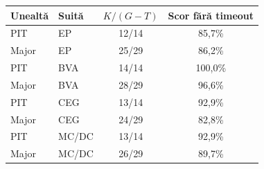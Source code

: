 \begin{center}
\begingroup\small
\begin{tabular}{@{}llcc@{}}
\toprule
Unealtă & Suită & $K/(G-T)$ & Scor fără timeout \\
\midrule
PIT & EP & 12/14 & 85,7\% \\
Major & EP & 25/29 & 86,2\% \\
PIT & BVA & 14/14 & 100,0\% \\
Major & BVA & 28/29 & 96,6\% \\
PIT & CEG & 13/14 & 92,9\% \\
Major & CEG & 24/29 & 82,8\% \\
PIT & MC/DC & 13/14 & 92,9\% \\
Major & MC/DC & 26/29 & 89,7\% \\
\bottomrule
\end{tabular}
\endgroup
\end{center}
